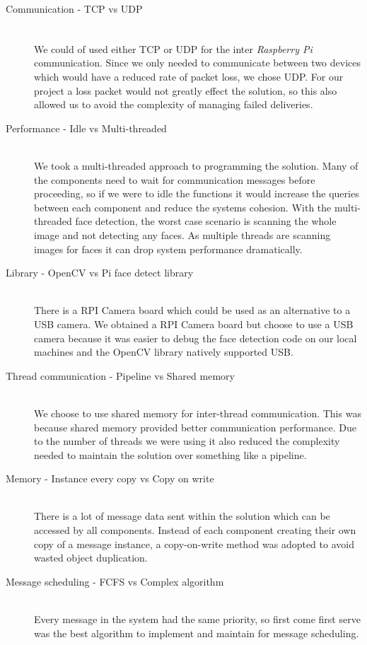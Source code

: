 \documentclass[11pt,a4paper,titlepage]{report}
\newcommand{\rpi}{\textit{Raspberry Pi\textsuperscript{\textregistered}}}
\begin{document}
\begin{description}

  \item[Communication - TCP vs UDP] \hfill \\
      We could of used either TCP or UDP for the inter \rpi\xspace communication. Since we only needed to communicate between two devices which would have a reduced rate of packet loss, we chose UDP. For our project a loss packet would not greatly effect the solution, so this also allowed us to avoid the complexity of managing failed deliveries.
      
  \item[Performance - Idle vs Multi-threaded] \hfill \\
      We took a multi-threaded approach to programming the solution. Many of the components need to wait for communication messages before proceeding, so if we were to idle the functions it would increase the queries between each component and reduce the systems cohesion. With the multi-threaded face detection, the worst case scenario is scanning the whole image and not detecting any faces. As multiple threads are scanning images for faces it can drop system performance dramatically.
  \item[Library - OpenCV vs Pi face detect library] \hfill \\
      There is a RPI Camera board which could be used as an alternative to a USB camera. We obtained a RPI Camera board but choose to use a USB camera because it was easier to debug the face detection code on our local machines and the OpenCV library natively supported USB.

  \item[Thread communication - Pipeline vs Shared memory] \hfill \\
      We choose to use shared memory for inter-thread communication. This was because shared memory provided better communication performance. Due to the number of threads we were using it also reduced the complexity needed to maintain the solution over something like a pipeline.

  \item[Memory - Instance every copy vs Copy on write] \hfill \\
      There is a lot of message data sent within the solution which can be accessed by all components. Instead of each component creating their own copy of a message instance, a copy-on-write method was adopted to avoid wasted object duplication.
      
  \item[Message scheduling - FCFS vs Complex algorithm] \hfill \\
      Every message in the system had the same priority, so first come first serve was the best algorithm to implement and maintain for message scheduling. 
      
\end{description}
\end{document}
